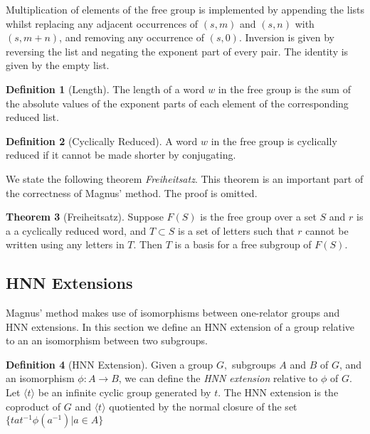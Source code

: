 \documentclass[11pt]{article} %
\theoremstyle{definition}
\newtheorem{theorem}{Theorem}[section]
\theoremstyle{definition}
\theoremstyle{definition}
\theoremstyle{definition}
\theoremstyle{definition}
\newtheorem{defn}[theorem]{Definition}
\theoremstyle{definition}
\begin{document}
Multiplication of elements of the free group is implemented by appending the lists
whilst replacing any adjacent occurrences of $(s, m)$ and $(s, n)$ with $(s, m + n)$, and removing
any occurrence of $(s, 0)$. Inversion is given by reversing the list and negating
the exponent part of every pair. The identity is given by the empty list.

\begin{defn}[Length]\label{length}
  The length of a word $w$ in the free group is the sum of the absolute values of the exponent
  parts of each element of the corresponding reduced list.
\end{defn}

\begin{defn}[Cyclically Reduced]\label{cycred}
  A word $w$ in the free group is cyclically reduced if it cannot be made shorter
  by conjugating.
\end{defn}

We state the following theorem \textit{Freiheitsatz}. This theorem is an important
part of the correctness of Magnus' method. The proof is omitted.

\begin{theorem}[Freiheitsatz]\label{freiheitsatz}
  Suppose $F(S)$ is the free group over a set $S$ and $r$ is a a cyclically reduced
  word, and $T \subset S$ is a set of letters such that $r$ cannot be written
  using any letters in $T$. Then $T$ is a basis for a free subgroup of $F(S)$.
  \cite{mccool_schupp_1973}
\end{theorem}

\subsection{HNN Extensions}\label{HNN}

Magnus' method makes use of isomorphisms between one-relator groups and HNN extensions.
In this section we define an HNN extension of a group relative to an
an isomorphism between two subgroups.

\begin{defn}[HNN Extension]
  Given a group $G,$ subgroups $A$ and $B$ of $G$, and an isomorphism $\phi: A \to B$, we can define
  the \textit{HNN extension} relative to $\phi$ of $G$. Let $\langle t \rangle$ be an infinite cyclic
  group generated by $t$. The HNN extension is the coproduct
  of $G$ and $\langle t \rangle$ quotiented
  by the normal closure of the set $\{ta t^{-1} \phi(a^{-1}) | a \in A\}$
\end{defn}
\end{document}
